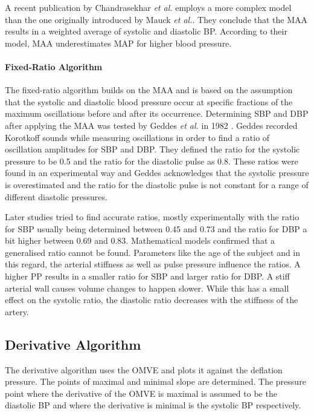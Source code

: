 A recent publication by Chandrasekhar \textit{et al.} \cite{Chandrasekhar2019} employs a more complex model than the one originally introduced by Mauck \textit{et al.}\cite{Mauck1980}. They conclude that the MAA results in a weighted average of systolic and diastolic BP. According to their model, MAA underestimates MAP for higher blood pressure.

\paragraph{Fixed-Ratio Algorithm} The fixed-ratio algorithm builds on the MAA and is based on the assumption that the systolic and diastolic blood pressure occur at specific fractions of the maximum oscillations before and after its occurrence. Determining SBP and DBP after applying the MAA was tested by Geddes \textit{et al.} in 1982 \cite{Geddes1982}. Geddes recorded Korotkoff sounds while measuring oscillations in order to find a ratio of oscillation amplitudes for SBP and DBP. They defined the ratio for the systolic pressure to be 0.5 and the ratio for the diastolic pulse as 0.8. These ratios were found in an experimental way and Geddes acknowledges that the systolic pressure is overestimated and the ratio for the diastolic pulse is not constant for a range of different diastolic pressures.

Later studies tried to find accurate ratios, mostly experimentally with the ratio for SBP usually being determined between 0.45 and 0.73 and the ratio for DBP a bit higher between 0.69 and 0.83.\cite{Drzewiecki1994,Forouzanfar2015} Mathematical models confirmed that a generalised ratio cannot be found. Parameters like the age of the subject and in this regard, the arterial stiffness as well as pulse pressure influence the ratios. \cite{Ursino1996} A higher PP results in a smaller ratio for SBP and larger ratio for DBP. A stiff arterial wall causes volume changes to happen slower. While this has a small effect on the systolic ratio, the diastolic ratio decreases with the stiffness of the artery.\cite{Babbs2012}



\subsection{Derivative Algorithm}
The derivative algorithm uses the OMVE and plots it against the deflation pressure. The points of maximal and minimal slope are determined. The pressure point where the derivative of the OMVE is maximal is assumed to be the diastolic BP and where the derivative is minimal is the systolic BP respectively. \cite{Jazbinsek2010,Forouzanfar2015}

